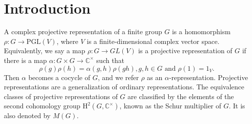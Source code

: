\documentclass[a4paper,11pt]{amsart}
\numberwithin{equation}{section}
\numberwithin{equation}{subsection}
\newcommand{\PGL}{\mathrm{PGL}}
\begin{document}
	\maketitle
	
	
	\section{Introduction}
	A complex projective representation of a finite group $G$ is a homomorphism $\rho \colon G \to \PGL(V)$, where $V$ is a finite-dimensional complex vector space. Equivalently, we say a map $\rho: G \to GL(V)$ is a projective representation of $G$ if there is a map $\alpha \colon G \times G \to \mathbb{C}^\times$ such that $$\rho(g)\rho(h)= \alpha(g,h)\rho(gh), g, h \in G \text{ and } \rho(1)=1_V.$$
	Then $\alpha$ becomes a cocycle of $G$, and we refer $\rho$ as an $\alpha$-representation.
	Projective representations are a generalization of ordinary representations. The equivalence classes of projective representations of $G$ are classified by the elements of the second
	cohomology group $\mathrm{H}^2(G,\mathbb{C}^{\times})$, known as the Schur multiplier of $G$. It is also denoted by $M(G)$.
	
\end{document}
